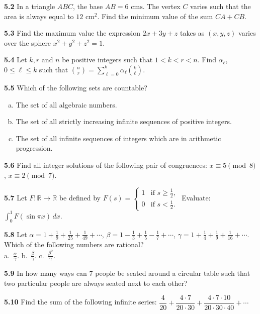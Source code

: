 \documentclass[11pt,a4paper]{article}
\newcommand{\R}{\mathbb{R}}
\newcommand{\qitem}[1]{\par\medskip\noindent\textbf{#1}\hspace{0.5em}}
\begin{document}
\qitem{5.2} In a triangle $ABC$, the base $AB = 6\text{ cms}$. The vertex $C$ varies such that the area is always equal to $12\text{ cm}^2$. Find the minimum value of the sum $CA + CB$.

\qitem{5.3} Find the maximum value the expression $2x + 3y + z$ takes as $(x, y, z)$ varies over the sphere $x^2 + y^2 + z^2 = 1$.

\qitem{5.4} Let $k, r$ and $n$ be positive integers such that $1 < k < r < n$. Find $\alpha_\ell$, $0 \le \ell \le k$ such that $\binom{n}{r} = \sum_{\ell=0}^{k} \alpha_\ell \binom{k}{\ell}$.

\qitem{5.5} Which of the following sets are countable?
\begin{enumerate}[a.]
  \item The set of all algebraic numbers.
  \item The set of all strictly increasing infinite sequences of positive integers.
  \item The set of all infinite sequences of integers which are in arithmetic progression.
\end{enumerate}

\qitem{5.6} Find all integer solutions of the following pair of congruences: $x \equiv 5 \pmod{8}$, $x \equiv 2 \pmod{7}$.

\qitem{5.7} Let $F : \R \to \R$ be defined by $F(s) = \begin{cases} 1 & \text{if } s \ge \frac{1}{2}, \\ 0 & \text{if } s < \frac{1}{2}. \end{cases}$ Evaluate: $\int_0^1 F(\sin\pi x)\,dx$.

\qitem{5.8} Let $\alpha = 1 + \frac{1}{9} + \frac{1}{25} + \frac{1}{49} + \cdots$, $\beta = 1 - \frac{1}{3} + \frac{1}{5} - \frac{1}{7} + \cdots$, $\gamma = 1 + \frac{1}{4} + \frac{1}{9} + \frac{1}{16} + \cdots$. Which of the following numbers are rational?\\
a.\ $\frac{\alpha}{\gamma}$. \qquad b.\ $\frac{\beta}{\gamma}$. \qquad c.\ $\frac{\beta^2}{\gamma}$.

\qitem{5.9} In how many ways can $7$ people be seated around a circular table such that two particular people are always seated next to each other?

\qitem{5.10} Find the sum of the following infinite series: $\dfrac{4}{20} + \dfrac{4\cdot 7}{20\cdot 30} + \dfrac{4\cdot 7\cdot 10}{20\cdot 30\cdot 40} + \cdots$
\end{document}

